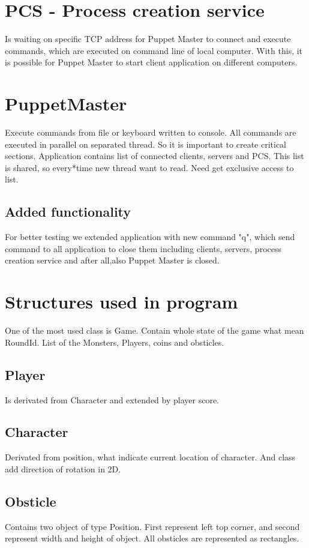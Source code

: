 \documentclass[times, 10pt,twocolumn]{article}
\begin{document}
\section{PCS - Process creation service}

Is waiting on specific TCP address for Puppet Master to connect and execute commands, which are executed on command line of local computer. With this, it is possible for Puppet Master to start client application on different computers.

\section{PuppetMaster}

Execute commands from file or keyboard written to console. All commands are executed in parallel on separated thread. So it is important to create critical sections. Application contains list of connected clients, servers and PCS. This list is shared, so every*time new thread want to read. Need get exclusive access to list.
\subsection{Added functionality}
For better testing we extended application with new command "q", which send command to all application to close them including clients, servers, process creation service and after all,also Puppet Master is closed.
\section{Structures used in program}
One of the most used class is Game. Contain whole state of the game what mean RoundId. List of the Monsters, Players, coins and obsticles.
\subsection{Player}
Is derivated from Character and extended by player score.
\subsection{Character}
Derivated from position, what indicate current location of character. And class add direction of rotation in 2D.
\subsection{Obsticle}
Contains two object of type Position. First represent left top corner, and second represent width and height of object. All obsticles are represented as rectangles.
\end{document}
